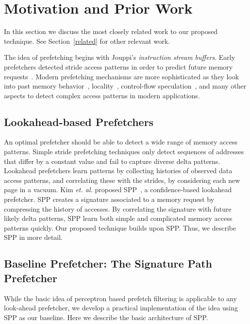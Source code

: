 \section{Motivation and Prior Work}
\label{Background}

In this section we discuss the most closely related work to our proposed
technique. See Section~\ref{related} for other relevant work.

The idea of prefetching begins with Jouppi's \textit{instruction stream
buffers}. Early prefetchers detected stride access patterns in order to
predict future memory requests~\cite{Smith,Baer,Stride}.  Modern prefetching
mechanisms are more sophisticated as they look into past memory
behavior~\cite{Address_Correlated,AMPM},
locality~\cite{Spatial_Pattern,SMS,Temporal_Instruction_Fetch,Off_Chip,STMS,SMS_JILP},
control-flow speculation~\cite{BFetch,MTBFetch}, and many other aspects to
detect complex access patterns in modern applications.

\subsection{Lookahead-based Prefetchers}

An optimal prefetcher should be able to detect a wide range of memory access
patterns. Simple stride prefetching techniques only detect sequences of
addresses that differ by a constant value and fail to capture diverse delta
patterns. Lookahead prefetchers learn patterns by collecting histories of
observed data access patterns, and correlating these with the strides, by
considering each new page in a vacuum. Kim {\em et. al.} proposed
SPP~\cite{SPP}, a confidence-based lookahead prefetcher. SPP creates a
signature associated to a memory request by compressing the history of
accesses. By correlating the signature with future likely delta patterns, SPP
learn both simple and complicated memory access patterns quickly. Our proposed
technique builds upon SPP. Thus, we describe SPP in more detail.

\subsection{Baseline Prefetcher: The Signature Path Prefetcher}
\label{Background-SPP}

While the basic idea of perceptron based prefetch filtering is applicable to
any look-ahead prefetcher, we develop a practical implementation of the idea
using SPP as our baseline.  Here we describe the basic architecture of SPP.

